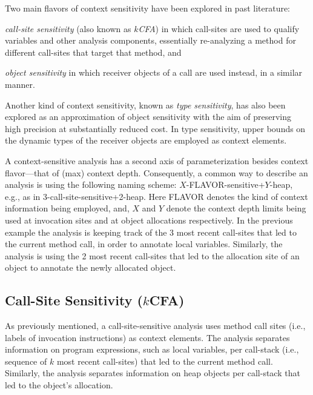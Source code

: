 Two main flavors of context sensitivity have been explored in past literature:
\begin{inparaenum}[(1)]
\item \emph{call-site sensitivity} (also known as \emph{$k$CFA}) \cite{col:1981:Sharir,thesis:Shivers} in which call-sites are used to qualify variables and other analysis components, essentially re-analyzing a method for different call-sites that target that method, and
\item \emph{object sensitivity} \cite{issta:2002:Milanova,article:2005:Milanova,popl:2011:Smaragdakis} in which receiver objects of a call are used instead, in a similar manner.
\end{inparaenum}
Another kind of context sensitivity, known as \emph{type sensitivity}, has also been explored as an approximation of object sensitivity with the aim of preserving high precision at substantially reduced cost. In type sensitivity, upper bounds on the dynamic types of the receiver objects are employed as context elements.

A context-sensitive analysis has a second axis of parameterization besides context flavor---that of (max) context depth. Consequently, a common way to describe an analysis is using the following naming scheme: $X$-FLAVOR-sensitive+$Y$-heap, e.g., as in 3-call-site-sensitive+2-heap. Here FLAVOR denotes the kind of context information being employed, and, $X$ and $Y$ denote the context depth limits being used at invocation sites and at object allocations respectively. In the previous example the analysis is keeping track of the 3 most recent call-sites that led to the current method call, in order to annotate local variables. Similarly, the analysis is using the 2 most recent call-sites that led to the allocation site of an object to annotate the newly allocated object.


\subsection{Call-Site Sensitivity (\texorpdfstring{$k$}{k}CFA)}

As previously mentioned, a call-site-sensitive analysis uses method call sites (i.e., labels of invocation instructions) as context elements. The analysis separates information on program expressions, such as local variables, per call-stack (i.e., sequence of $k$ most recent call-sites) that led to the current method call. Similarly, the analysis separates information on heap objects per call-stack that led to the object's allocation.

